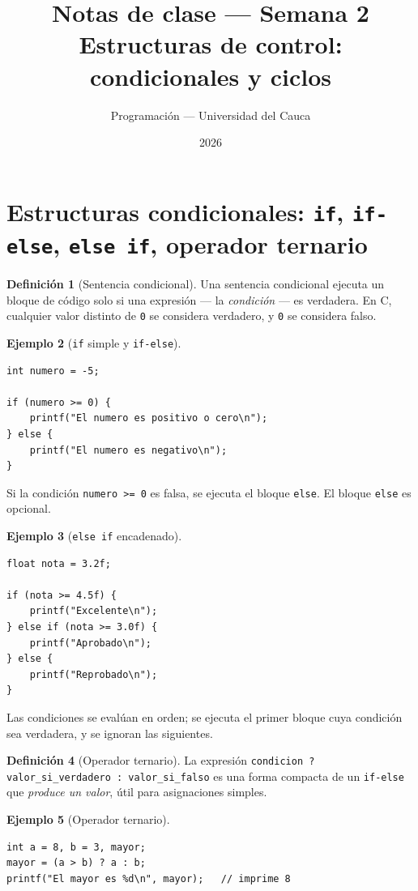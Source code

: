 \documentclass[11pt,letterpaper]{article}
\title{\textcolor{unicaucaverde}{\Large Notas de clase --- Semana 2}\\[4pt]
  \large Estructuras de control: condicionales y ciclos}
\author{Programación --- Universidad del Cauca}
\date{2026}
\theoremstyle{definition}
\newtheorem{definicion}{Definición}[section]
\newtheorem{ejemplo}[definicion]{Ejemplo}
\begin{document}
\maketitle
\tableofcontents

\section{Estructuras condicionales: \texttt{if}, \texttt{if-else}, \texttt{else if}, operador ternario}

\begin{definicion}[Sentencia condicional]
Una sentencia condicional ejecuta un bloque de código solo si una expresión --- la
\emph{condición} --- es verdadera. En C, cualquier valor distinto de \texttt{0} se considera
verdadero, y \texttt{0} se considera falso.
\end{definicion}

\begin{ejemplo}[\texttt{if} simple y \texttt{if-else}]
\begin{lstlisting}
int numero = -5;

if (numero >= 0) {
    printf("El numero es positivo o cero\n");
} else {
    printf("El numero es negativo\n");
}
\end{lstlisting}
Si la condición \texttt{numero >= 0} es falsa, se ejecuta el bloque \texttt{else}. El bloque
\texttt{else} es opcional.
\end{ejemplo}

\begin{ejemplo}[\texttt{else if} encadenado]
\begin{lstlisting}
float nota = 3.2f;

if (nota >= 4.5f) {
    printf("Excelente\n");
} else if (nota >= 3.0f) {
    printf("Aprobado\n");
} else {
    printf("Reprobado\n");
}
\end{lstlisting}
Las condiciones se evalúan en orden; se ejecuta el primer bloque cuya condición sea verdadera, y
se ignoran las siguientes.
\end{ejemplo}

\begin{definicion}[Operador ternario]
La expresión \texttt{condicion ? valor\_si\_verdadero : valor\_si\_falso} es una forma compacta de
un \texttt{if-else} que \emph{produce un valor}, útil para asignaciones simples.
\end{definicion}

\begin{ejemplo}[Operador ternario]
\begin{lstlisting}
int a = 8, b = 3, mayor;
mayor = (a > b) ? a : b;
printf("El mayor es %d\n", mayor);   // imprime 8
\end{lstlisting}
\end{ejemplo}
\end{document}
